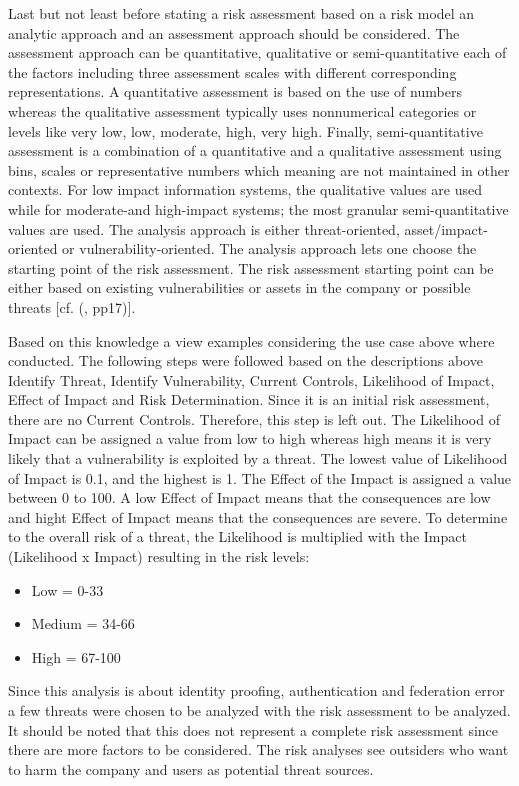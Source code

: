 Last but not least before stating a risk assessment based on a risk model an analytic approach and an assessment approach should be considered. The assessment approach can be quantitative, qualitative or semi-quantitative each of the factors including three assessment scales with different corresponding representations. A quantitative assessment is based on the use of numbers whereas the qualitative assessment typically uses nonnumerical categories or levels like very low, low, moderate, high, very high. Finally, semi-quantitative assessment is a combination of a quantitative and a qualitative assessment using bins, scales or representative numbers which meaning are not maintained in other contexts. For low impact information systems, the qualitative values are used while for moderate-and high-impact systems; the most granular semi-quantitative values are used. The analysis approach is either threat-oriented, asset/impact-oriented or vulnerability-oriented. The analysis approach lets one choose the starting point of the risk assessment. The risk assessment starting point can be either based on existing vulnerabilities or assets in the company or possible threats  [cf. (\cite{NIST:2012:GCRA}, pp17)].

Based on this knowledge a view examples considering the use case above where conducted. The following steps were followed based on the descriptions above Identify Threat, Identify Vulnerability, Current Controls, Likelihood of Impact, Effect of Impact and Risk Determination. Since it is an initial risk assessment, there are no Current Controls. Therefore, this step is left out. The Likelihood of Impact can be assigned a value from low to high whereas high means it is very likely that a vulnerability is exploited by a threat. The lowest value of Likelihood of Impact is 0.1, and the highest is 1. The Effect of the Impact is assigned a value between 0 to 100. A low Effect of Impact means that the consequences are low and hight Effect of Impact means that the consequences are severe. To determine to the overall risk of a threat, the Likelihood is multiplied with the Impact (Likelihood x Impact) resulting in the risk levels:

\begin{itemize}
	\item Low =     0-33
	\item Medium = 34-66
	\item High =   67-100
\end{itemize}

Since this analysis is about identity proofing, authentication and federation error a few threats were chosen to be analyzed with the risk assessment to be analyzed. It should be noted that this does not represent a complete risk assessment since there are more factors to be considered. The risk analyses see outsiders who want to harm the company and users as potential threat sources. 

